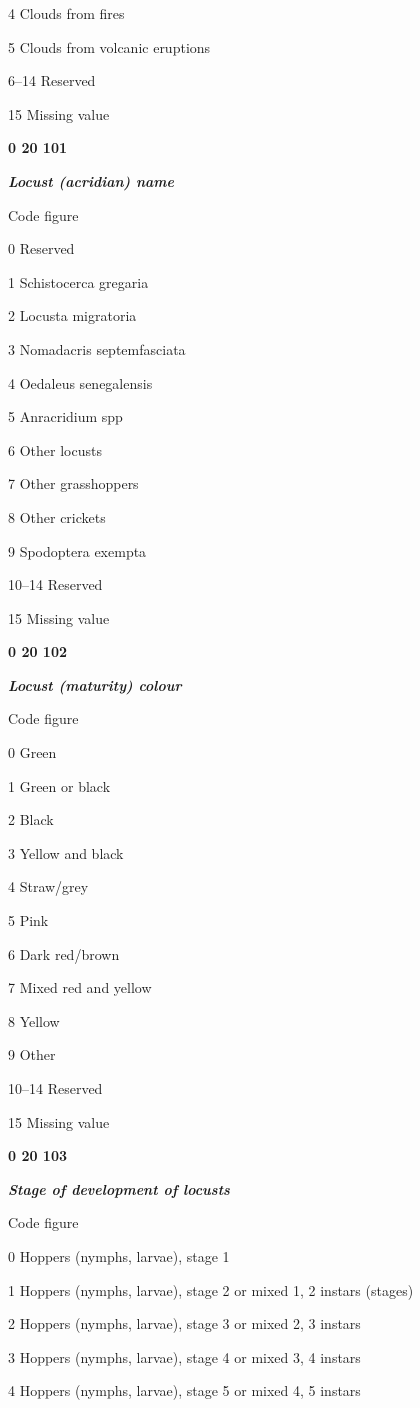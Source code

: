 4 Clouds from fires

5 Clouds from volcanic eruptions

6--14 Reserved

15 Missing value

\textbf{0 20 101}

\emph{\textbf{Locust (acridian) name}}

Code figure

0 Reserved

1 Schistocerca gregaria

2 Locusta migratoria

3 Nomadacris septemfasciata

4 Oedaleus senegalensis

5 Anracridium spp

6 Other locusts

7 Other grasshoppers

8 Other crickets

9 Spodoptera exempta

10--14 Reserved

15 Missing value

\textbf{0 20 102}

\emph{\textbf{Locust (maturity) colour}}

Code figure

0 Green

1 Green or black

2 Black

3 Yellow and black

4 Straw/grey

5 Pink

6 Dark red/brown

7 Mixed red and yellow

8 Yellow

9 Other

10--14 Reserved

15 Missing value

\textbf{0 20 103}

\emph{\textbf{Stage of development of locusts}}

Code figure

0 Hoppers (nymphs, larvae), stage 1

1 Hoppers (nymphs, larvae), stage 2 or mixed 1, 2 instars (stages)

2 Hoppers (nymphs, larvae), stage 3 or mixed 2, 3 instars

3 Hoppers (nymphs, larvae), stage 4 or mixed 3, 4 instars

4 Hoppers (nymphs, larvae), stage 5 or mixed 4, 5 instars

